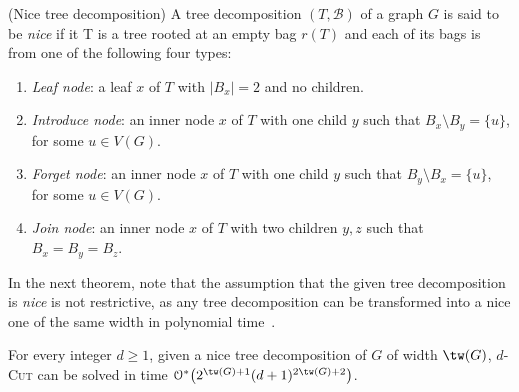 \documentclass[a4paper,UKenglish,cleveref, autoref]{lipics-v2019}
\newcommand{\bigOs}[1]{\mathcal{O}^*\!\left(#1\right)}
\newcommand{\pname}[1]{\textsc{#1}}
\begin{document}
\begin{definition}{(Nice tree decomposition)}
    A tree decomposition $(T, \mathcal{B})$ of a graph $G$ is said to be \emph{nice} if it T is a tree rooted at an empty bag $r(T)$ and each of its bags is from one of the following four types:
    \begin{enumerate}
        \item \textit{Leaf node}: a leaf $x$ of $T$ with $|B_x| = 2$ and no children.
        \item \textit{Introduce node}: an inner node $x$ of $T$ with one child $y$ such that $B_x \setminus B_y = \{u\}$, for some $u \in V(G)$.
        \item \textit{Forget node}: an inner node $x$ of $T$ with one child $y$ such that $B_y \setminus B_x = \{u\}$, for some $u \in V(G)$.
        \item \textit{Join node}: an inner node $x$ of $T$ with two children $y,z$ such that $B_x = B_y = B_z$.
    \end{enumerate}
\end{definition}


In the next theorem, note that the assumption that the given tree decomposition is {\sl nice} is not restrictive, as any tree decomposition can be transformed into a nice one of the same width in polynomial time~\cite{Klo94}.

\begin{theorem}\label{thm:treewidth}
    For every integer $d \geq 1$, given a nice tree decomposition of $G$ of width $\tw(G)$, \pname{$d$-Cut} can be solved in time $\bigOs{2^{\tw(G)+1}(d+1)^{2\tw(G) + 2}}$.
\end{theorem}
\end{document}
